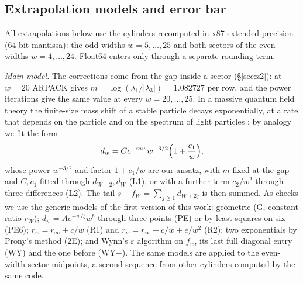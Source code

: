 \documentclass[11pt]{amsart}
\theoremstyle{definition}
\theoremstyle{remark}
\begin{document}
\subsection{Extrapolation models and error bar}
All extrapolations below use the cylinders recomputed in x87 extended precision (64-bit mantissa):
the odd widths $w = 5, \dots, 25$ and both sectors of the even widths $w = 4, \dots, 24$. Float64
enters only through a separate rounding term.

\emph{Main model.} The corrections come from the gap inside a sector (\S\ref{sec:z2}): at $w = 20$
ARPACK gives $m = \log(\lambda_1/|\lambda_3|) = 1.082727$ per row, and the power iterations give the
same value at every $w = 20, \dots, 25$. In a massive quantum field theory the finite-size mass
shift of a stable particle decays exponentially, at a rate that depends on the particle and on the
spectrum of light particles \cite{luscher1986}; by analogy we fit the form
\[
  d_w = C e^{-mw} w^{-3/2} \Bigl(1 + \frac{c_1}{w}\Bigr),
\]
whose power $w^{-3/2}$ and factor $1 + c_1/w$ are our ansatz, with $m$ fixed at the gap and $C, c_1$
fitted through $d_{W-2}, d_W$ (L1), or with a further term
$c_2/w^2$ through three differences (L2). The tail $s - f_W = \sum_{j \ge 1} d_{W+2j}$ is then
summed. As checks we use the generic models of the first version of this work: geometric (G,
constant ratio $r_W$); $d_w = A e^{-w/\xi} w^b$ through three points (PE) or by least squares on
six (PE6); $r_w = r_\infty + c/w$ (R1) and $r_w = r_\infty + c/w + e/w^2$ (R2); two exponentials
by Prony's method (2E); and Wynn's $\varepsilon$ algorithm \cite{wynn1956} on $f_w$, its last
full diagonal entry (WY) and the one before (WY$-$). The same models are applied to the even-width
sector midpoints, a second sequence from other cylinders computed by the same code.
\end{document}
